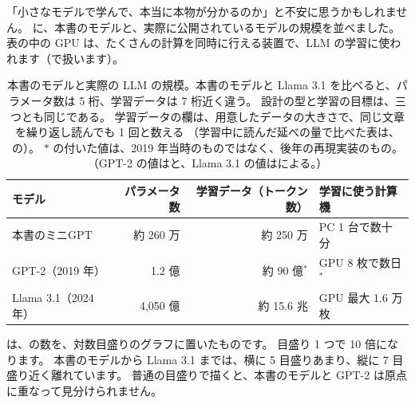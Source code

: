 「小さなモデルで学んで、本当に本物が分かるのか」と不安に思うかもしれません。
に、本書のモデルと、実際に公開されているモデルの規模を並べました。
表の中の GPU は、たくさんの計算を同時に行える装置で、LLM の学習に使われます（で扱います）。

\begin{table}[htbp]
\centering
\caption{本書のモデルと実際の LLM の規模。本書のモデルと Llama 3.1 を比べると、パラメータ数は 5 桁、学習データは 7 桁近く違う。
設計の型と学習の目標は、三つとも同じである。
学習データの欄は、用意したデータの大きさで、同じ文章を繰り返し読んでも 1 回と数える
（学習中に読んだ延べの量で比べた表は、の）。
$\ast$ の付いた値は、2019 年当時のものではなく、後年の再現実装\cite{karpathy2022nanogpt}のもの。
（GPT-2 の値は\cite{radford2019language}と\cite{karpathy2022nanogpt}、Llama 3.1 の値は\cite{dubey2024llama3}による。）}
\label{tab:intro-scale}
\small
\begin{tabular}{lrrl}
\toprule
モデル & パラメータ数 & 学習データ（トークン数） & 学習に使う計算機 \\
\midrule
本書のミニGPT & 約 260 万 & 約 250 万 & PC 1 台で数十分 \\
GPT-2（2019 年） & 1.2 億 & 約 90 億$^{\ast}$ & GPU 8 枚で数日$^{\ast}$ \\
Llama 3.1（2024 年） & 4,050 億 & 約 15.6 兆 & GPU 最大 1.6 万枚 \\
\bottomrule
\end{tabular}
\end{table}

は、の数を、対数目盛りのグラフに置いたものです。
目盛り 1 つで 10 倍になります。
本書のモデルから Llama 3.1 までは、横に 5 目盛りあまり、縦に 7 目盛り近く離れています。
普通の目盛りで描くと、本書のモデルと GPT-2 は原点に重なって見分けられません。


